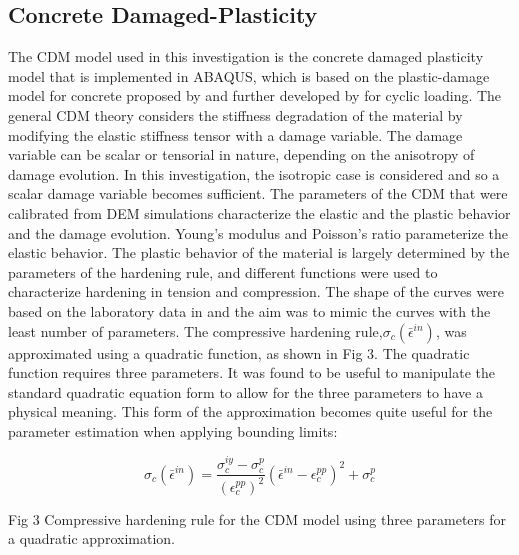 \subsection{Concrete Damaged-Plasticity}

The CDM model used in this investigation is the concrete damaged plasticity
model that is implemented in ABAQUS, which is based on the plastic-damage
model for concrete proposed by \cite{lubliner_plastic-damage_1989} and further
developed by \cite{lee_plastic-damage_1998} for cyclic loading. The general
CDM theory considers the stiffness degradation of the material by
modifying the elastic stiffness tensor with a damage variable. The
damage variable can be scalar or tensorial in nature, depending on
the anisotropy of damage evolution. In this investigation, the isotropic
case is considered and so a scalar damage variable becomes sufficient.
The parameters of the CDM that were calibrated from DEM simulations
characterize the elastic and the plastic behavior and the damage evolution.
Young's modulus and Poisson's ratio parameterize the elastic behavior.
The plastic behavior of the material is largely determined by the
parameters of the hardening rule, and different functions were used
to characterize hardening in tension and compression. The shape of
the curves were based on the laboratory data in \cite{wahalathantri_material_2011} and the aim was to mimic the curves with the least number of
parameters. The compressive hardening rule,$\sigma_{c}\left(\bar{\epsilon}^{in}\right)$,
was approximated using a quadratic function, as shown in Fig 3. The
quadratic function requires three parameters. It was found to be useful
to manipulate the standard quadratic equation form to allow for the
three parameters to have a physical meaning. This form of the approximation
becomes quite useful for the parameter estimation when applying bounding
limits:

\begin{equation}
\sigma_{c}\left(\bar{\epsilon}^{in}\right)=\frac{\sigma_{c}^{iy}-\sigma_{c}^{p}}{\left(\epsilon_{c}^{pp}\right)^{2}}\left(\bar{\epsilon}^{in}-\epsilon_{c}^{pp}\right)^{2}+\sigma_{c}^{p}\label{eqn:param2-1}
\end{equation}


Fig 3 Compressive hardening rule for the CDM model using three parameters
for a quadratic approximation.

